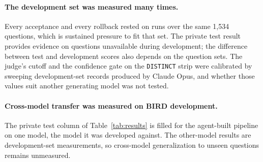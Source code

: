 \paragraph{The development set was measured many times.} Every acceptance and
every rollback rested on runs over the same 1,534 questions, which is sustained
pressure to fit that set. The private test result provides evidence on questions unavailable during
development; the difference between test and development scores also depends
on the question sets.
The judge's cutoff and the confidence gate on the \texttt{DISTINCT} strip were
calibrated by sweeping development-set records produced by Claude Opus, and
whether those values suit another generating model was not tested.

\paragraph{Cross-model transfer was measured on BIRD development.} The private test
column of Table~\ref{tab:results} is filled for the agent-built pipeline on one
model, the model it was developed against. The other-model results are development-set measurements,
so cross-model generalization to unseen questions remains unmeasured.

